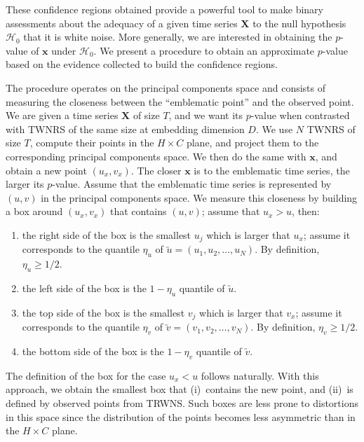 \documentclass[a4,11pt]{pssbmac}
\begin{document}
	These confidence regions obtained provide a powerful tool to make binary assessments about the adequacy of a given time series $\bm X$ to the null hypothesis $\mathcal H_0$ that it is white noise.
	More generally, we are interested in obtaining the $p$-value of $\bm x$ under $\mathcal H_0$.
	We present a procedure to obtain an approximate $p$-value based on the evidence collected to build the confidence regions.
	
	The procedure operates on the principal components space and consists of measuring the closeness between the ``emblematic point'' and the observed point.
	We are given a time series $\bm X$ of size $T$, and we want its $p$-value when contrasted with TWNRS of the same size at embedding dimension $D$.
	We use $N$ TWNRS of size $T$, compute their points in the $H\times C$ plane, and project them to the corresponding principal components space.
	We then do the same with $\bm x$, and obtain a new point $(u_x,v_x)$.
	The closer $\bm x$ is to the emblematic time series, the larger its $p$-value.
	Assume that the emblematic time series is represented by $(u,v)$ in the principal components space.
	We measure this closeness by building a box around $(u_x,v_x)$ that contains $(u,v)$; assume that $u_x>u$, then:
	\begin{enumerate}
		\item the right side of the box is the smallest $u_j$ which is larger that $u_x$; assume it corresponds to the quantile $\eta_u$ of $\utilde u = (u_1,u_2,\dots, u_N)$. By definition, $\eta_u\geq 1/2$.
		\item the left side of the box is the $1-\eta_u$ quantile of $\utilde u$.
		\item the top side of the box is the smallest $v_j$ which is larger that $v_x$; assume it corresponds to the quantile $\eta_v$ of $\utilde v = (v_1,v_2,\dots, v_N)$. By definition, $\eta_v\geq 1/2$.
		\item the bottom side of the box is the $1-\eta_v$ quantile of $\utilde v$.
	\end{enumerate}
	
	The definition of the box for the case $u_x<u$ follows naturally.
	With this approach, we obtain the smallest box that (i)~contains the new point, and (ii)~is defined by observed points from TRWNS.
	Such boxes are less prone to distortions in this space since the distribution of the points becomes less asymmetric than in the $H\times C$ plane.
	
\end{document}
